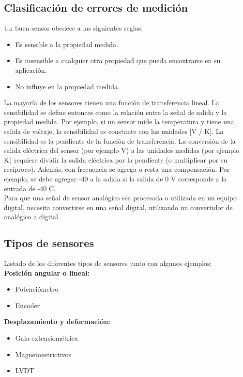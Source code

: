 \subsection{Clasificación de errores de medición}

Un buen sensor obedece a las siguientes reglas:

\begin{itemize}
 \item Es sensible a la propiedad medida.
 \item Es insensible a cualquier otra propiedad que pueda encontrarse en su aplicación.
 \item No influye en la propiedad medida.
\end{itemize}

La mayoría de los sensores tienen una función de transferencia lineal. La sensibilidad se define entonces como la relación entre la señal de salida y la propiedad medida. 
Por ejemplo, si un sensor mide la temperatura y tiene una salida de voltaje, la sensibilidad es constante con las unidades [V / K]. La sensibilidad es la pendiente de la función 
de transferencia. La conversión de la salida eléctrica del sensor (por ejemplo V) a las unidades medidas (por ejemplo K) requiere dividir la salida eléctrica por la pendiente 
(o multiplicar por su recíproco). Además, con frecuencia se agrega o resta una compensación. Por ejemplo, se debe agregar -40 a la salida si la salida de 0 V corresponde a la 
entrada de -40 \textdegree C.\\

Para que una señal de sensor analógico sea procesada o utilizada en un equipo digital, necesita convertirse en una señal digital, utilizando un convertidor de analógico a 
digital.


\subsection{Tipos de sensores}

Listado de los diferentes tipos de sensores junto con algunos ejemplos:\\

\textbf{Posición angular o lineal:}
\begin{itemize}
 \item Potenciómetro
 \item Encoder
\end{itemize}

\textbf{Desplazamiento y deformación:}
\begin{itemize}
 \item Gala extensiométrica
 \item Magnetoestrictivos
 \item LVDT
\end{itemize}

